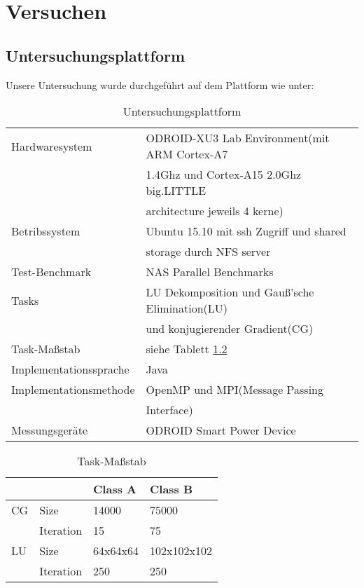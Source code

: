\chapter{Versuchen}
\label{chap:Versuchen}

\section{Untersuchungsplattform}
\label{sec:Untersuchungsplattform}
Unsere Untersuchung wurde durchgeführt auf dem Plattform wie unter:

\begin{table}[htbp]
\begin{center}
\begin{tabular}{ l | l }
	Hardwaresystem 	& ODROID-XU3 Lab Environment(mit ARM Cortex-A7\\
					& 1.4Ghz und Cortex-A15 2.0Ghz big.LITTLE\\
					& architecture jeweils 4 kerne)\\ \hline
	Betribssystem 	& Ubuntu 15.10 mit ssh Zugriff und shared\\
					& storage durch NFS server\\ \hline
	Test-Benchmark 	& NAS Parallel Benchmarks\\ \hline
	Tasks 			& LU Dekomposition und Gauß'sche Elimination(LU)\\ \hline
					& und konjugierender Gradient(CG)\\ \hline
	Task-Maßstab	& siehe Tablett \ref{tab:Task-Massstab}\\ \hline
	Implementationssprache 	& Java\\ \hline
	Implementationsmethode 	& OpenMP und MPI(Message Passing\\
							& Interface)\\ \hline
	Messungsgeräte & ODROID Smart Power Device 
\end{tabular}
\end{center}
\label{tab:Untersuchungsplattform}
\caption{Untersuchungsplattform}
\end{table}

\begin{table}[htbp]
\begin{center}
\begin{tabular}{l|l|l|l}
	&			&Class A 	&Class B\\ \hline
CG 	&Size		&14000		&75000\\
	&Iteration	&15			&75\\ \hline
LU 	&Size		&64x64x64	&102x102x102\\
	&Iteration	&250		&250\\
\end{tabular}
\end{center}
\label{tab:Task-Massstab}
\caption{Task-Maßstab}
\end{table}

